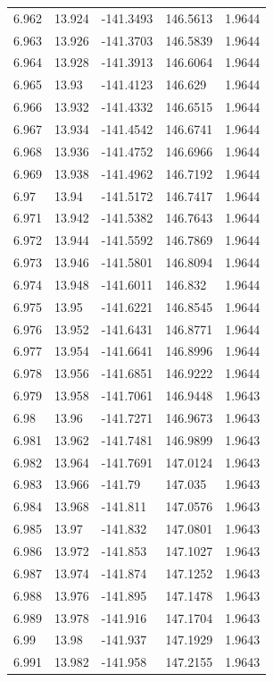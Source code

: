 \begin{tabular}{lllll}
6.962 & 13.924 & -141.3493 & 146.5613 & 1.9644 \\
6.963 & 13.926 & -141.3703 & 146.5839 & 1.9644 \\
6.964 & 13.928 & -141.3913 & 146.6064 & 1.9644 \\
6.965 & 13.93 & -141.4123 & 146.629 & 1.9644 \\
6.966 & 13.932 & -141.4332 & 146.6515 & 1.9644 \\
6.967 & 13.934 & -141.4542 & 146.6741 & 1.9644 \\
6.968 & 13.936 & -141.4752 & 146.6966 & 1.9644 \\
6.969 & 13.938 & -141.4962 & 146.7192 & 1.9644 \\
6.97 & 13.94 & -141.5172 & 146.7417 & 1.9644 \\
6.971 & 13.942 & -141.5382 & 146.7643 & 1.9644 \\
6.972 & 13.944 & -141.5592 & 146.7869 & 1.9644 \\
6.973 & 13.946 & -141.5801 & 146.8094 & 1.9644 \\
6.974 & 13.948 & -141.6011 & 146.832 & 1.9644 \\
6.975 & 13.95 & -141.6221 & 146.8545 & 1.9644 \\
6.976 & 13.952 & -141.6431 & 146.8771 & 1.9644 \\
6.977 & 13.954 & -141.6641 & 146.8996 & 1.9644 \\
6.978 & 13.956 & -141.6851 & 146.9222 & 1.9644 \\
6.979 & 13.958 & -141.7061 & 146.9448 & 1.9643 \\
6.98 & 13.96 & -141.7271 & 146.9673 & 1.9643 \\
6.981 & 13.962 & -141.7481 & 146.9899 & 1.9643 \\
6.982 & 13.964 & -141.7691 & 147.0124 & 1.9643 \\
6.983 & 13.966 & -141.79 & 147.035 & 1.9643 \\
6.984 & 13.968 & -141.811 & 147.0576 & 1.9643 \\
6.985 & 13.97 & -141.832 & 147.0801 & 1.9643 \\
6.986 & 13.972 & -141.853 & 147.1027 & 1.9643 \\
6.987 & 13.974 & -141.874 & 147.1252 & 1.9643 \\
6.988 & 13.976 & -141.895 & 147.1478 & 1.9643 \\
6.989 & 13.978 & -141.916 & 147.1704 & 1.9643 \\
6.99 & 13.98 & -141.937 & 147.1929 & 1.9643 \\
6.991 & 13.982 & -141.958 & 147.2155 & 1.9643 \\

\end{tabular}
